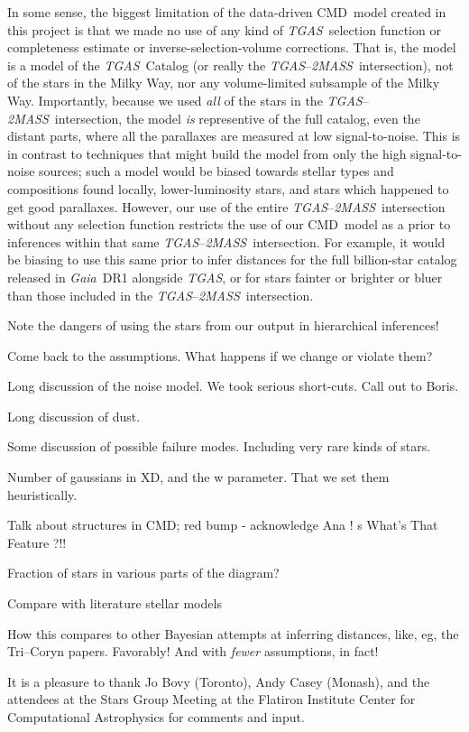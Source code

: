 \documentclass[12pt, preprint]{aastex6}
\newcommand{\acronym}[1]{{\small{#1}}}
\newcommand{\project}[1]{\textsl{#1}}
\newcommand{\tgas}{\project{\acronym{TGAS}}}
\newcommand{\tmass}{\project{\acronym{2MASS}}}
\newcommand{\gaia}{\project{Gaia}}
\newcommand{\xd}{\acronym{XD}}
\newcommand{\cmd}{\acronym{CMD}}
\begin{document}
In some sense, the biggest limitation of the data-driven \cmd\ model
created in this project is that we made no use of any kind of \tgas\ selection
function or completeness estimate or inverse-selection-volume corrections.
That is, the model is a model of the \tgas\ Catalog
(or really the \tgas--\tmass\ intersection), not of the stars in
the Milky Way, nor any volume-limited subsample of the Milky Way.
Importantly, because we used \emph{all} of the stars in the \tgas--\tmass\
intersection, the model \emph{is} representive of the full catalog,
even the distant parts, where all the parallaxes are measured at low
signal-to-noise.
This is in contrast to techniques that might build the model from only
the high signal-to-noise sources; such a model would be biased towards
stellar types and compositions found locally, lower-luminosity stars,
and stars which happened to get good parallaxes.
However, our use of the entire \tgas--\tmass\ intersection without
any selection function restricts the use of our \cmd\ model as a prior
to inferences within that same \tgas--\tmass\ intersection.
For example, it would be biasing to use this same prior to infer
distances for the full billion-star catalog released in \gaia\ DR1
alongside \tgas, or for stars fainter or brighter or bluer than those
included in the \tgas--\tmass\ intersection.

Note the dangers of using the stars from our output in hierarchical inferences!

Come back to the assumptions. What happens if we change or violate them?

Long discussion of the noise model. We took serious short-cuts. Call out to Boris.

Long discussion of dust.

Some discussion of possible failure modes. Including very rare kinds of stars.

Number of gaussians in \xd, and the w parameter. That we set them heuristically.

Talk about structures in CMD; red bump - acknowledge Ana ! s
What's That Feature ?!!

Fraction of stars in various parts of the diagram?

Compare with literature stellar models

How this compares to other Bayesian attempts at inferring distances,
like, eg, the Tri--Coryn papers. Favorably! And with \emph{fewer}
assumptions, in fact!

\acknowledgments It is a pleasure to thank
  Jo Bovy (Toronto),
  Andy Casey (Monash),
and the attendees at the Stars Group Meeting at the Flatiron Institute
Center for Computational Astrophysics for comments and input.
\end{document}
